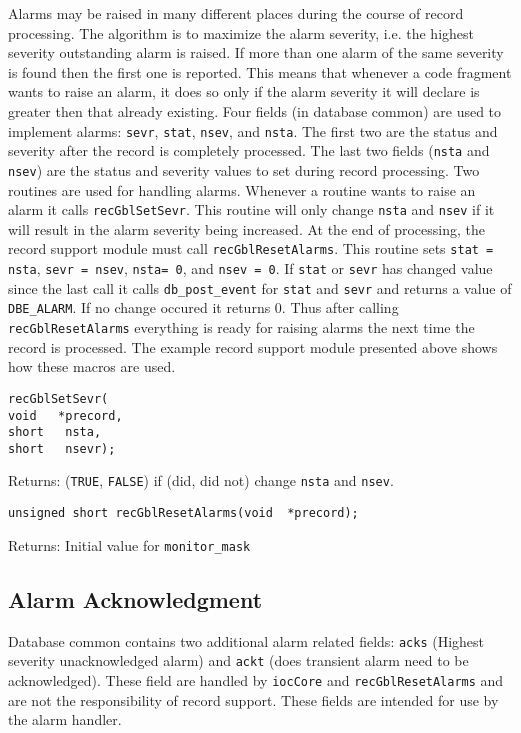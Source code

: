 Alarms may be raised in many different places during the course of record processing. The algorithm is to maximize the 
alarm severity, i.e. the highest severity outstanding alarm is raised. If more than one alarm of the same severity is found 
then the first one is reported. This means that whenever a code fragment wants to raise an alarm, it does so only if the 
alarm severity it will declare is greater then that already existing. Four fields (in database common) are used to implement 
alarms: \verb|sevr|, \verb|stat|, \verb|nsev|, and \verb|nsta|. The first two are the status and severity after the record is completely processed. 
The last two fields (\verb|nsta| and \verb|nsev|) are the status and severity values to set during record processing. Two routines are 
used for handling alarms. Whenever a routine wants to raise an alarm it calls \verb|recGblSetSevr|. This routine will only 
change \verb|nsta| and \verb|nsev| if it will result in the alarm severity being increased. At the end of processing, the record support 
module must call \verb|recGblResetAlarms|. This routine sets \verb|stat = nsta|, \verb|sevr = nsev|, \verb|nsta= 0|, and \verb|nsev = 0|. If \verb|stat| 
or \verb|sevr| has changed value since the last call it calls \verb|db_post_event| for \verb|stat| and \verb|sevr| and returns a value of 
\verb|DBE_ALARM|. If no change occured it returns 0. Thus after calling \verb|recGblResetAlarms| everything is ready for raising 
alarms the next time the record is processed. The example record support module presented above shows how these 
macros are used.

\begin{verbatim}
recGblSetSevr(
void   *precord,
short   nsta,
short   nsevr);
\end{verbatim}

Returns: (\verb|TRUE|, \verb|FALSE|) if (did, did not) change \verb|nsta| and \verb|nsev|.

\begin{verbatim}
unsigned short recGblResetAlarms(void  *precord);
\end{verbatim}

Returns: Initial value for \verb|monitor_mask|

\subsection{Alarm Acknowledgment}

Database common contains two additional alarm related fields: \verb|acks| (Highest severity unacknowledged alarm) and 
\verb|ackt| (does transient alarm need to be acknowledged). These field are handled by \verb|iocCore| and \verb|recGblResetAlarms| 
and are not the responsibility of record support. These fields are intended for use by the alarm handler.

